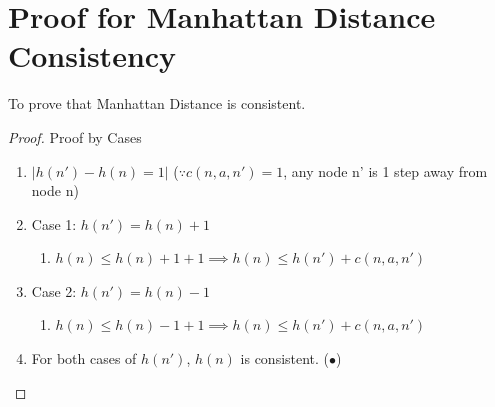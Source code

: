 \documentclass[runningheads]{llncs}
\begin{document}
\appendix
\section{Proof for Manhattan Distance Consistency}
\label{appendix:manhat_cons}

To prove that Manhattan Distance is consistent.
\begin{proof} Proof by Cases
    \begin{enumerate}
        \item \( |h(n') - h(n) = 1| \) (\( \because c(n, a, n') = 1 \), any node n' is 1 step away from node n)
        \item Case 1: \( h(n') = h(n) + 1 \)
        \begin{enumerate}
            \item \( h(n) \leq h(n) + 1 + 1 \implies h(n) \leq h(n') + c(n, a, n') \)
        \end{enumerate}
        \item Case 2: \( h(n') = h(n) - 1 \)
        \begin{enumerate}
            \item \( h(n) \leq h(n) - 1 + 1 \implies h(n) \leq h(n') + c(n, a, n') \)
        \end{enumerate}
        \item For both cases of \( h(n') \), \( h(n) \) is consistent. (\(\bullet\))
    \end{enumerate}
\end{proof}
\end{document}
